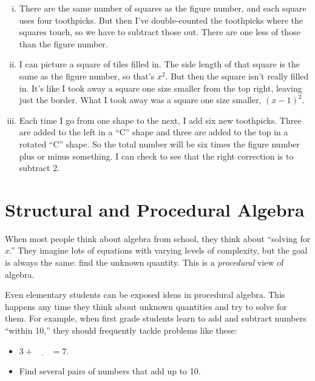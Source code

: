 \begin{enumerate}[(i)]
\item
There are the same number of squares as the figure number, and each square uses four toothpicks.  But then I've double-counted the toothpicks  where the squares touch, so we have to subtract those out.  There are one less of those than the figure number.\\

\newpage 

\item
I can picture a square of tiles filled in.  The side length of that square is the same as the figure number, so that's $x^2$.  But then the square isn't really filled in.  It's like I took away a square one size smaller from the top right, leaving just the border.  What I took away was a square one size smaller, $(x-1)^2$.\\

\item
Each time I go from one shape to the next, I add six new toothpicks.  Three are added to the left in a ``C'' shape and three are added to the top in a rotated ``C'' shape.  So the total number will be six times the figure number plus or minus something.  I can check to see that the right correction is to subtract 2.\\


\end{enumerate}




\newpage



\section{Structural and Procedural Algebra}
When most people think about algebra from school, they think about ``solving for $x$.''  They imagine lots of equations with varying levels of complexity, but the goal is always the same: find the unknown quantity.  This is a \emph{procedural} view of algebra.  

Even elementary students can  be exposed  ideas in procedural algebra.   This happens any time   they think about unknown quantities and try to solve for them.  For example, when first grade students learn to add and subtract numbers ``within 10,'' they should frequently tackle problems like these:

\begin{itemize}
\item
$3 + \underline{\qquad} = 7$.\\
\medskip
\item
Find several pairs of numbers that add up to 10.\\
\medskip
\end{itemize}

